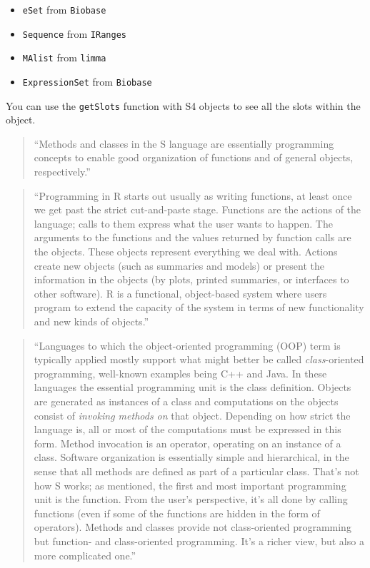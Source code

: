 \documentclass[]{tufte-book}
\providecommand{\tightlist}{%
  \setlength{\itemsep}{0pt}\setlength{\parskip}{0pt}}
\begin{document}
\begin{itemize}
\tightlist
\item
  \texttt{eSet} from \texttt{Biobase}
\item
  \texttt{Sequence} from \texttt{IRanges}
\item
  \texttt{MAlist} from \texttt{limma}
\item
  \texttt{ExpressionSet} from \texttt{Biobase}
\end{itemize}

You can use the \texttt{getSlots} function with S4 objects to see all the
slots within the object.

\begin{quote}
``Methods and classes in the S language are essentially programming concepts to
enable good organization of functions and of general objects, respectively.''
\citep{chambers2006s4}
\end{quote}

\begin{quote}
``Programming in R starts out usually as writing functions, at least once we
get past the strict cut-and-paste stage. Functions are the actions of the
language; calls to them express what the user wants to happen. The arguments to
the functions and the values returned by function calls are the objects. These
objects represent everything we deal with. Actions create new objects (such as
summaries and models) or present the information in the objects (by plots,
printed summaries, or interfaces to other software). R is a functional,
object-based system where users program to extend the capacity of the system in
terms of new functionality and new kinds of objects.'' \citep{chambers2006s4}
\end{quote}

\begin{quote}
``Languages to which the object-oriented programming (OOP) term is typically
applied mostly support what might better be called \emph{class}-oriented programming,
well-known examples being C++ and Java. In these languages the essential
programming unit is the class definition. Objects are generated as instances of
a class and computations on the objects consist of \emph{invoking methods on} that
object. Depending on how strict the language is, all or most of the computations
must be expressed in this form. Method invocation is an operator, operating on
an instance of a class. Software organization is essentially simple and
hierarchical, in the sense that all methods are defined as part of a particular
class. That's not how S works; as mentioned, the first and most important
programming unit is the function. From the user's perspective, it's all done by
calling functions (even if some of the functions are hidden in the form of
operators). Methods and classes provide not class-oriented programming but
function- and class-oriented programming. It's a richer view, but also a more
complicated one.'' \citep{chambers2006s4}
\end{quote}
\end{document}
